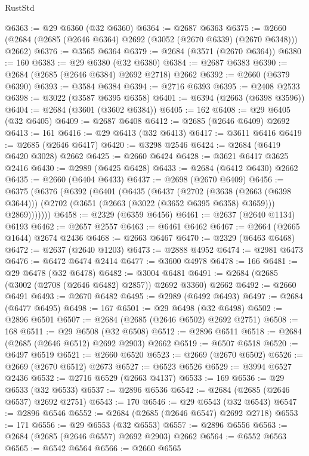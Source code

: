 \begin{lexlean}{RustStd}
\begin{coremodule}
@6363 := @29 @6360 (@32 @6360)
@6364 := @2687 @6363
@6375 := @2660 (@2684 (@2685 (@2646 @6364) @2692 (@3052 (@2670 @6339) (@2670 @6348))) @2662)
@6376 := @3565 @6364
@6379 := @2684 (@3571 (@2670 @6364))
@6380 := 160
@6383 := @29 @6380 (@32 @6380)
@6384 := @2687 @6383
@6390 := @2684 (@2685 (@2646 @6384) @2692 @2718) @2662
@6392 := @2660 (@6379 @6390)
@6393 := @3584 @6384
@6394 := @2716 @6393
@6395 := @2408 @2533
@6398 := @3022 (@3587 @6395 @6358)
@6401 := @6394 (@2663 (@6398 @3596))
@6404 := @2684 (@3601 (@3602 @6384))
@6405 := 162
@6408 := @29 @6405 (@32 @6405)
@6409 := @2687 @6408
@6412 := @2685 (@2646 @6409) @2692
@6413 := 161
@6416 := @29 @6413 (@32 @6413)
@6417 := @3611 @6416
@6419 := @2685 (@2646 @6417)
@6420 := @3298 @2546
@6424 := @2684 (@6419 @6420 @3028) @2662
@6425 := @2660 @6424
@6428 := @3621 @6417 @3625 @2416
@6430 := @2989 (@6425 @6428)
@6433 := @2684 (@6412 @6430) @2662
@6435 := @2660 (@6404 @6433)
@6437 := @2698 (@2670 @6409)
@6456 := @6375
    (@6376
      (@6392
        (@6401
          (@6435
            (@6437
              (@2702
                (@3638 (@2663 (@6398 @3644)))
                (@2702 (@3651 (@2663 (@3022 (@3652 @6395 @6358) @3659))) @2869)))))))
@6458 := @2329 (@6359 @6456)
@6461 := @2637 (@2640 @1134) @6193
@6462 := @2657 @2557
@6463 := @6461 @6462
@6467 := @2664 (@2665 @1644) @2674 @2436
@6468 := @2663 @6467
@6470 := @2329 (@6463 @6468)
@6472 := @2637 (@2640 @1203)
@6473 := @2888 @4952
@6474 := @2981 @6473
@6476 := @6472 @6474 @2414
@6477 := @3600 @4978
@6478 := 166
@6481 := @29 @6478 (@32 @6478)
@6482 := @3004 @6481
@6491 := @2684 (@2685 (@3002 (@2708 (@2646 @6482) @2857)) @2692 @3360) @2662
@6492 := @2660 @6491
@6493 := @2670 @6482
@6495 := @2989 (@6492 @6493)
@6497 := @2684 (@6477 @6495)
@6498 := 167
@6501 := @29 @6498 (@32 @6498)
@6502 := @2896 @6501
@6507 := @2684 (@2685 (@2646 @6502) @2692 @2751)
@6508 := 168
@6511 := @29 @6508 (@32 @6508)
@6512 := @2896 @6511
@6518 := @2684 (@2685 (@2646 @6512) @2692 @2903) @2662
@6519 := @6507 @6518
@6520 := @6497 @6519
@6521 := @2660 @6520
@6523 := @2669 (@2670 @6502)
@6526 := @2669 (@2670 @6512) @2673
@6527 := @6523 @6526
@6529 := @3994 @6527 @2436
@6532 := @2716 @6529 (@2663 @4137)
@6533 := 169
@6536 := @29 @6533 (@32 @6533)
@6537 := @2896 @6536
@6542 := @2684 (@2685 (@2646 @6537) @2692 @2751)
@6543 := 170
@6546 := @29 @6543 (@32 @6543)
@6547 := @2896 @6546
@6552 := @2684 (@2685 (@2646 @6547) @2692 @2718)
@6553 := 171
@6556 := @29 @6553 (@32 @6553)
@6557 := @2896 @6556
@6563 := @2684 (@2685 (@2646 @6557) @2692 @2903) @2662
@6564 := @6552 @6563
@6565 := @6542 @6564
@6566 := @2660 @6565

\end{coremodule}
\end{lexlean}
